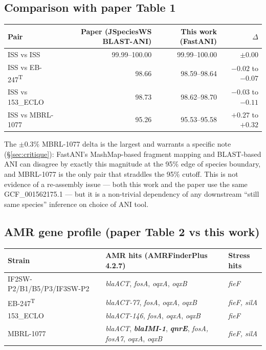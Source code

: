 \documentclass[11pt]{article}
\begin{document}
\subsection{Comparison with paper Table 1}
\begin{tabularx}{\linewidth}{Xrrr}
\toprule
Pair & Paper (JSpeciesWS BLAST-ANI) & This work (FastANI) & $\Delta$ \\
\midrule
ISS vs ISS       & 99.99--100.00 & 99.99--100.00 & $\pm 0.00$ \\
ISS vs EB-247\textsuperscript{T} & 98.66 & 98.59--98.64 & $-0.02$ to $-0.07$ \\
ISS vs 153\_ECLO & 98.73 & 98.62--98.70 & $-0.03$ to $-0.11$ \\
ISS vs MBRL-1077 & 95.26 & 95.53--95.58 & $+0.27$ to $+0.32$ \\
\bottomrule
\end{tabularx}

The $\pm 0.3\%$ MBRL-1077 delta is the largest and warrants a specific note
(\S\ref{sec:critique}): FastANI's MashMap-based fragment mapping and BLAST-based ANI can
disagree by exactly this magnitude at the 95\% edge of species boundary, and MBRL-1077 is
the only pair that straddles the 95\% cutoff. This is not evidence of a re-assembly
issue --- both this work and the paper use the same GCF\_001562175.1 --- but it is a
non-trivial dependency of any downstream ``still same species'' inference on choice of ANI
tool.

\subsection{AMR gene profile (paper Table 2 vs this work)}
\begin{footnotesize}
\begin{tabularx}{\linewidth}{lXX}
\toprule
Strain & AMR hits (AMRFinderPlus 4.2.7) & Stress hits \\
\midrule
IF2SW-P2/B1/B5/P3/IF3SW-P2 & \emph{blaACT}, \emph{fosA}, \emph{oqxA}, \emph{oqxB} & \emph{fieF} \\
EB-247\textsuperscript{T}   & \emph{blaACT-77}, \emph{fosA}, \emph{oqxA}, \emph{oqxB} & \emph{fieF, silA} \\
153\_ECLO                   & \emph{blaACT-146}, \emph{fosA}, \emph{oqxA}, \emph{oqxB} & \emph{fieF} \\
MBRL-1077                   & \emph{blaACT}, \textbf{\emph{blaIMI-1}}, \textbf{\emph{qnrE}}, \emph{fosA, fosA7}, \emph{oqxA}, \emph{oqxB} & \emph{fieF, silA} \\
\bottomrule
\end{tabularx}
\end{footnotesize}
\end{document}
